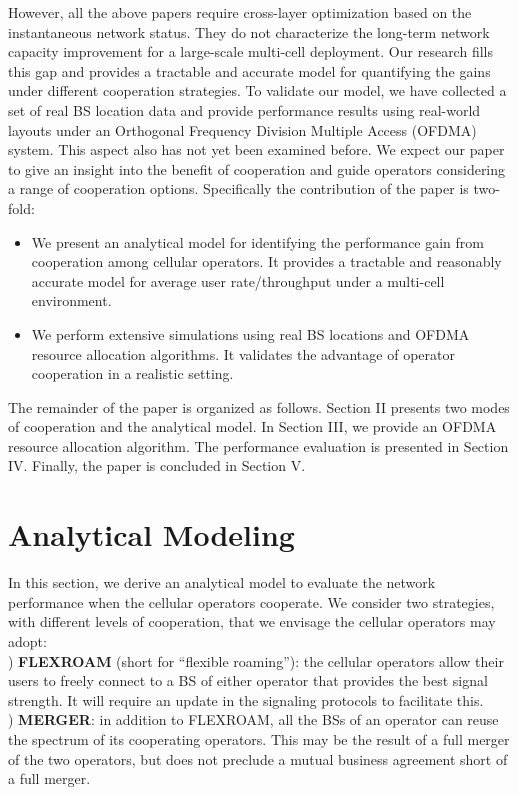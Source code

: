 \documentclass[conference]{IEEEtran}
\begin{document}
However, all the above papers require cross-layer optimization based on the instantaneous network status. They do not characterize the long-term network capacity improvement for a large-scale multi-cell deployment. Our research fills this gap and provides a tractable and accurate model for quantifying the gains under different cooperation strategies. To validate our model, we have collected a set of real BS location data and provide performance results using real-world layouts under an Orthogonal Frequency Division Multiple Access (OFDMA) system. This aspect also has not yet been examined before. We expect our paper to give an insight into the benefit of cooperation and guide operators considering a range of cooperation options. Specifically the contribution of the paper is two-fold:
\begin{itemize}
\item We present an analytical model for identifying the performance gain from cooperation among cellular operators. It provides a tractable and reasonably accurate model for average user rate/throughput under a multi-cell environment.
\item We perform extensive simulations using real BS locations and OFDMA resource allocation algorithms. It validates the advantage of operator cooperation in a realistic setting.
\end{itemize}

The remainder of the paper is organized as follows. Section II presents two modes of cooperation and the analytical model. In Section III, we provide an OFDMA resource allocation algorithm. The performance evaluation is presented in Section IV. Finally, the paper is concluded in Section V.

\section{Analytical Modeling}

In this section, we derive an analytical model to evaluate the network performance when the cellular operators cooperate. We consider two strategies, with different levels of cooperation, that we envisage the cellular operators may adopt:
\\ ) \textbf{FLEXROAM} (short for ``flexible roaming''): the cellular operators allow their users to freely connect to a BS of either operator that provides the best signal strength. It will require an update in the signaling protocols to facilitate this. \\
) \textbf{MERGER}: in addition to FLEXROAM, all the BSs of an operator can reuse the spectrum of its cooperating operators. This may be the result of a full merger of the two operators, but does not preclude a mutual business agreement short of a full merger.
\end{document}
